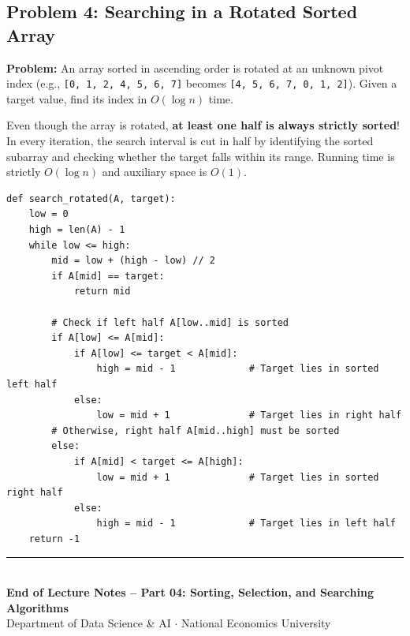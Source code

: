 \documentclass[11pt,a4paper]{article}
\begin{document}
\subsection{Problem 4: Searching in a Rotated Sorted Array}
\textbf{Problem:} An array sorted in ascending order is rotated at an unknown pivot index (e.g., \lstinline{[0, 1, 2, 4, 5, 6, 7]} becomes \lstinline{[4, 5, 6, 7, 0, 1, 2]}). Given a target value, find its index in $O(\log n)$ time.

\begin{definitionbox}
Even though the array is rotated, \textbf{at least one half is always strictly sorted}! In every iteration, the search interval is cut in half by identifying the sorted subarray and checking whether the target falls within its range. Running time is strictly $O(\log n)$ and auxiliary space is $O(1)$.
\end{definitionbox}

\begin{lstlisting}[style=pythonstyle]
def search_rotated(A, target):
    low = 0
    high = len(A) - 1
    while low <= high:
        mid = low + (high - low) // 2
        if A[mid] == target:
            return mid

        # Check if left half A[low..mid] is sorted
        if A[low] <= A[mid]:
            if A[low] <= target < A[mid]:
                high = mid - 1             # Target lies in sorted left half
            else:
                low = mid + 1              # Target lies in right half
        # Otherwise, right half A[mid..high] must be sorted
        else:
            if A[mid] < target <= A[high]:
                low = mid + 1              # Target lies in sorted right half
            else:
                high = mid - 1             # Target lies in left half
    return -1
\end{lstlisting}

\vspace{1.5em}
\begin{center}
\rule{0.6\textwidth}{0.6pt}\\[0.4em]
{\small\color{ForestGreen}\textbf{End of Lecture Notes -- Part 04: Sorting, Selection, and Searching Algorithms}}\\[0.2em]
{\footnotesize\color{DarkGray}Department of Data Science \& AI $\cdot$ National Economics University}
\end{center}
\end{document}
